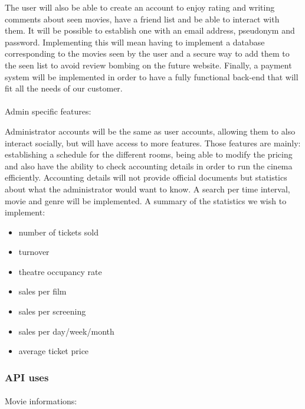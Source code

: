 \documentclass[
  french,
  11pt,
  a4paper,
]{article}
\makeatletter
\let\oldparagraph\paragraph
\renewcommand{\paragraph}{
    \@ifstar
      \xxxParagraphStar
      \xxxParagraphNoStar
  }
\newcommand{\xxxParagraphStar}[1]{\oldparagraph*{#1}\mbox{}}
\newcommand{\xxxParagraphNoStar}[1]{\oldparagraph{#1}\mbox{}}
\providecommand{\tightlist}{%
  \setlength{\itemsep}{0pt}\setlength{\parskip}{0pt}}
\makeatother
\begin{document}
The user will also be able to create an account to enjoy rating and
writing comments about seen movies, have a friend list and be able to
interact with them. It will be possible to establish one with an email
address, pseudonym and password. Implementing this will mean having to
implement a database corresponding to the movies seen by the user and a
secure way to add them to the seen list to avoid review bombing on the
future website. Finally, a payment system will be implemented in order
to have a fully functional back-end that will fit all the needs of our
customer.

\paragraph{Admin specific features:}\label{admin-specific-features}

Administrator accounts will be the same as user accounts, allowing them
to also interact socially, but will have access to more features. Those
features are mainly: establishing a schedule for the different rooms,
being able to modify the pricing and also have the ability to check
accounting details in order to run the cinema efficiently. Accounting
details will not provide official documents but statistics about what
the administrator would want to know. A search per time interval, movie
and genre will be implemented. A summary of the statistics we wish to
implement:

\begin{itemize}
\tightlist
\item
  number of tickets sold
\item
  turnover
\item
  theatre occupancy rate
\item
  sales per film
\item
  sales per screening
\item
  sales per day/week/month
\item
  average ticket price
\end{itemize}

\subsubsection{API uses}\label{api-uses}

\paragraph{Movie informations:}\label{movie-informations}
\end{document}
